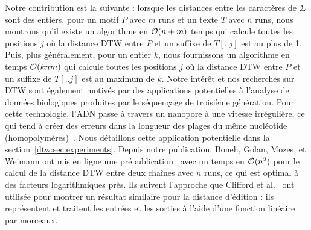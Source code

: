 Notre contribution est la suivante : lorsque les distances entre les caractères de $\Sigma$ sont des entiers, pour un motif $P$ avec $m$ runs et un texte $T$ avec $n$ runs, nous montrons qu'il existe un algorithme en $\mathcal{O}(n+m)$ temps qui calcule toutes les positions $j$ où la distance DTW entre $P$ et un suffixe de $T[..j]$ est au plus de 1. Puis, plus généralement, pour un entier $k$, nous fournissons un algorithme en temps $\mathcal{O}(knm)$ qui calcule toutes les positions $j$ où la distance DTW entre $P$ et un suffixe de $T[..j]$ est au maximum de $k$.
Notre intérêt et nos recherches sur DTW sont également motivés par des applications potentielles à l'analyse de données biologiques produites par le séquençage de troisième génération. Pour cette technologie, l'ADN passe à travers un nanopore à une vitesse irrégulière, ce qui tend à créer des erreurs dans la longueur des plages du même nucléotide (homopolymères)~\cite{delahaye2021sequencing}. Nous détaillons cette application potentielle dans la section~\ref{dtw:sec:experiments}.
Depuis notre publication, Boneh, Golan, Mozes, et Weimann ont mis en ligne une prépublication~\cite{boneh2023near} avec un temps en $\tilde{\mathcal{O}}(n^2)$ pour le calcul de la distance DTW entre deux chaînes avec $n$ runs, ce qui est optimal à des facteurs logarithmiques près. Ils suivent l'approche que Clifford et al.~\cite{clifford2019rle} ont utilisée pour montrer un résultat similaire pour la distance d'édition : ils représentent et traitent les entrées et les sorties à l'aide d'une fonction linéaire par morceaux.\\

